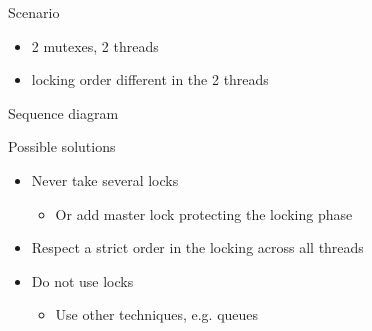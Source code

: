 \begin{frame}[fragile]
  \begin{exampleblock}{Scenario}
    \begin{itemize}
    \item 2 mutexes, 2 threads
    \item locking order different in the 2 threads
    \end{itemize}
  \end{exampleblock}
  \pause
  \begin{block}{Sequence diagram}
  \end{block}
\end{frame}

\begin{frame}[fragile]
  \begin{block}{Possible solutions}
    \begin{itemize}
    \item Never take several locks
      \begin{itemize}
      \item Or add master lock protecting the locking phase
      \end{itemize}
    \item Respect a strict order in the locking across all threads
    \item Do not use locks
      \begin{itemize}
      \item Use other techniques, e.g. queues
      \end{itemize}
    \end{itemize}
  \end{block}
\end{frame}

